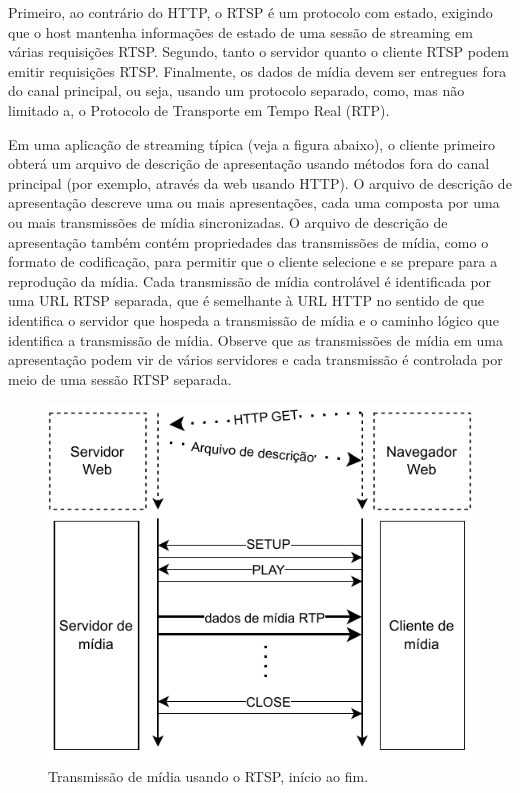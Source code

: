 \documentclass[12pt, %
openright, 
oneside, %
a4paper,    %
brazil]{facom-ufu-abntex2}
\begin{document}
Primeiro, ao contrário do HTTP, o RTSP é um protocolo com estado, exigindo que
o host mantenha informações de estado de uma sessão de streaming em várias
requisições RTSP. Segundo, tanto o servidor quanto o cliente RTSP podem emitir
requisições RTSP. Finalmente, os dados de mídia devem ser entregues fora do
canal principal, ou seja, usando um protocolo separado, como, mas não limitado
a, o Protocolo de Transporte em Tempo Real (RTP).

Em uma aplicação de streaming típica (veja a figura abaixo), o cliente primeiro
obterá um arquivo de descrição de apresentação usando métodos fora do canal
principal (por exemplo, através da web usando HTTP). O arquivo de descrição de
apresentação descreve uma ou mais apresentações, cada uma composta por uma ou
mais transmissões de mídia sincronizadas. O arquivo de descrição de
apresentação também contém propriedades das transmissões de mídia, como o
formato de codificação, para permitir que o cliente selecione e se prepare para
a reprodução da mídia. Cada transmissão de mídia controlável é identificada por
uma URL RTSP separada, que é semelhante à URL HTTP no sentido de que identifica
o servidor que hospeda a transmissão de mídia e o caminho lógico que identifica
a transmissão de mídia. Observe que as transmissões de mídia em uma
apresentação podem vir de vários servidores e cada transmissão é controlada por
meio de uma sessão RTSP separada. \cite{rfc2326}

\begin{figure}[!ht]
	\centering
	\includegraphics[width=0.8\linewidth]{rtsp.pdf}
	\caption[Diagrama RTSP]{Transmissão de mídia usando o RTSP, início ao fim. }
	\label{fig:rtspDiagram}
\end{figure}
\end{document}
